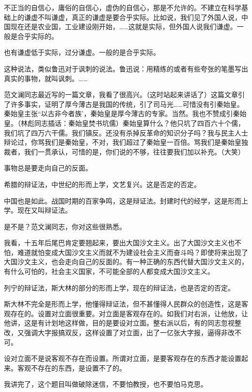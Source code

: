 不正当的自信心，庸俗的自信心，虚伪的自信心，那是不允许的。不建立在科学基础上的谦虚不叫谦虚，真正的谦虚是要合乎实际。比如说，我们见了外国人说，中国现在还是农业国，工业建设刚开始，……这就是实际，但外国人说我们谦虚。一般是合乎实际的。

也有谦虚低于实际，过分谦虚。一般的是合乎实际。

这种说法，类似鲁迅对于讽刺的说法。鲁迅说：用精练的或者有些夸张的笔墨写出真实的事物，就叫讽刺。……

范文澜同志最近写的一篇文章，我看了很高兴。（这时站起来讲话了）这篇文章引了许多事实，证明了厚今薄古是我国的传统，引了司马光……可惜没有引秦始皇。秦始皇主张“以古非今者族’，秦始皇是厚今薄古的专家。当然。我也不赞成引秦始皇。（林彪同志插话：秦始皇焚书坑儒）秦始皇算什么？他只坑了四百六十个儒，我们坑了四万六干儒。我们镇反。还没有杀掉反革命的知识分子吗？我与民主人士辩论过，你骂我们是秦始皇，不对，我们超过了秦始皇一百倍。骂我们是秦始皇独裁者，我们一贯承认，可惜的是，你们说的不够，往往要我们加以补充。（大笑）


事物总是要走向自己的反面。

希腊的辩证法，中世纪的形而上学，文艺复兴。这是否定的否定。

中国也是如此。战国时期的百家争鸣，这是辩证法。封建时代的经学，这是形而上学。现在又叫辩证法。

是不是？范文澜同志，你对这些很熟悉。

我看，十五年后尾巴肯定要翘起来，要出大国沙文主义。出了大国沙文主义也不怕，难道就怕变成大国沙文主义而就不为建设社会主义而奋斗吗？即使将来出现了大国沙文主义，也会走向自己的反面的。有一种正确的东西代替大国沙文主义的，有什么可怕的，社会主义国家，不可能全部的人都变成大国沙文主义。

列宁的辩证法，斯大林的部分的形而上学，现在的辩证法，也是否定的否定。

斯大林不完全是形而上学，他懂得辩证法，但不甚懂得人民群众的创造性，这是客观存在的。设置对立面很重要。对立面是客观存在的。如我们对右派，让他放，让他讲，这是有计划地这样做，目的是要设对立面。整右派以后，有的同志忽视整改，又强调大字报搞双反，这样设置了对立面，出了一亿张大字报，逼得非改不可。

设对立面不是说客观不存在而设置。所谓对立面，是要客观存在的东西才能设置起来。客观不存在的东西，是设置不了的。


我讲完了，这个题目叫做破除迷信，不要怕教授，也不要怕马克思。


